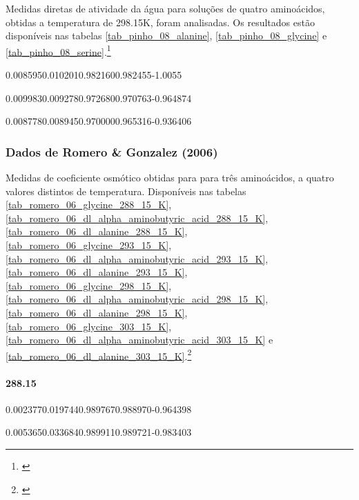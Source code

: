 Medidas diretas de atividade da água para soluções de quatro aminoácidos,
obtidas a temperatura de 298.15K, foram analisadas. Os resultados estão disponíveis
nas tabelas \ref{tab_pinho_08_alanine}, \ref{tab_pinho_08_glycine} e
\ref{tab_pinho_08_serine}.\footnote{\cite{pinho2008}}

%
%
	{0.008595}{0.010201}{0.982160}{0.982455}{-1.0055}

%
%
	{0.009983}{0.009278}{0.972680}{0.970763}{-0.964874}

%
%
	{0.008778}{0.008945}{0.970000}{0.965316}{-0.936406}

\FloatBarrier

\subsubsection{Dados de Romero \& Gonzalez (2006)}

Medidas de coeficiente osmótico obtidas para para três aminoácidos, a quatro
valores distintos de temperatura. Disponíveis nas tabelas
\ref{tab_romero_06_glycine_288_15_K},
\ref{tab_romero_06_dl_alpha_aminobutyric_acid_288_15_K},
\ref{tab_romero_06_dl_alanine_288_15_K}, \ref{tab_romero_06_glycine_293_15_K},
\ref{tab_romero_06_dl_alpha_aminobutyric_acid_293_15_K},
\ref{tab_romero_06_dl_alanine_293_15_K}, \ref{tab_romero_06_glycine_298_15_K},
\ref{tab_romero_06_dl_alpha_aminobutyric_acid_298_15_K},
\ref{tab_romero_06_dl_alanine_298_15_K}, \ref{tab_romero_06_glycine_303_15_K},
\ref{tab_romero_06_dl_alpha_aminobutyric_acid_303_15_K}
e \ref{tab_romero_06_dl_alanine_303_15_K}.\footnote{\cite{romero2006}}

\paragraph{288.15}


%
	{0.002377}{0.019744}{0.989767}{0.988970}{-0.964398}

%
	{0.005365}{0.033684}{0.989911}{0.989721}{-0.983403}

